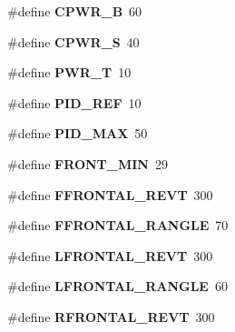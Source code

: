 \begin{DoxyCompactItemize}
\item 
\hypertarget{fence_8nxc_a738b9657b067e383cd066d4c7ca6f576}{
\#define {\bfseries CPWR\_\-B}~60}
\label{fence_8nxc_a738b9657b067e383cd066d4c7ca6f576}

\item 
\hypertarget{fence_8nxc_ae382ea7d9a3437076c5616056836377a}{
\#define {\bfseries CPWR\_\-S}~40}
\label{fence_8nxc_ae382ea7d9a3437076c5616056836377a}

\item 
\hypertarget{fence_8nxc_a542a0090a7c37b6404cf8ba31d59f57d}{
\#define {\bfseries PWR\_\-T}~10}
\label{fence_8nxc_a542a0090a7c37b6404cf8ba31d59f57d}

\item 
\hypertarget{fence_8nxc_a211c307420126f39f228195cf77ae83c}{
\#define {\bfseries PID\_\-REF}~10}
\label{fence_8nxc_a211c307420126f39f228195cf77ae83c}

\item 
\hypertarget{fence_8nxc_a2ded3bab320b6ac387798d39189fb505}{
\#define {\bfseries PID\_\-MAX}~50}
\label{fence_8nxc_a2ded3bab320b6ac387798d39189fb505}

\item 
\hypertarget{fence_8nxc_ac9341f36c8b85c8d70f06973c2d9a5bd}{
\#define {\bfseries FRONT\_\-MIN}~29}
\label{fence_8nxc_ac9341f36c8b85c8d70f06973c2d9a5bd}

\item 
\hypertarget{fence_8nxc_acb1164349a1fa4b7052e28f7c7c735d4}{
\#define {\bfseries FFRONTAL\_\-REVT}~300}
\label{fence_8nxc_acb1164349a1fa4b7052e28f7c7c735d4}

\item 
\hypertarget{fence_8nxc_abda398fa4722b8691dc8c52c733a2814}{
\#define {\bfseries FFRONTAL\_\-RANGLE}~70}
\label{fence_8nxc_abda398fa4722b8691dc8c52c733a2814}

\item 
\hypertarget{fence_8nxc_aac0491bc7a39228e57b85de235ef59eb}{
\#define {\bfseries LFRONTAL\_\-REVT}~300}
\label{fence_8nxc_aac0491bc7a39228e57b85de235ef59eb}

\item 
\hypertarget{fence_8nxc_ad19631fb45582ad9441719c376c07c3b}{
\#define {\bfseries LFRONTAL\_\-RANGLE}~60}
\label{fence_8nxc_ad19631fb45582ad9441719c376c07c3b}

\item 
\hypertarget{fence_8nxc_a623033e48068d57555d513a2d56d0c40}{
\#define {\bfseries RFRONTAL\_\-REVT}~300}
\label{fence_8nxc_a623033e48068d57555d513a2d56d0c40}


\end{DoxyCompactItemize}
